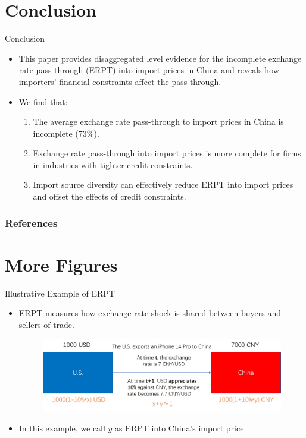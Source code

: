 \documentclass[10pt]{beamer}
\begin{document}
\section{Conclusion}

\begin{frame}{Conclusion}
	\begin{itemize}
		\item This paper provides disaggregated level evidence for the incomplete exchange rate pass-through (ERPT) into import prices in China and reveals how importers’ financial constraints affect the pass-through.
		\item We find that:
		\begin{enumerate}
			\item The average exchange rate pass-through to import prices in China is incomplete (73\%).
			\item Exchange rate pass-through into import prices is more complete for firms in industries with tighter credit constraints.
			\item Import source diversity can effectively reduce ERPT into import prices and offset the effects of credit constraints.
		\end{enumerate}
	\end{itemize}
\end{frame}

\begin{frame}
    \frametitle{References}
    \footnotesize
    
\end{frame}

\appendix
\renewcommand{\thetable}{A.\arabic{table}}
\setcounter{table}{0}

\section*{More Figures}
\begin{frame}[label=example_ERPT]{Illustrative Example of ERPT}
    \begin{itemize}
        \item ERPT measures how exchange rate shock is shared between buyers and sellers of trade.
    \begin{figure}[htbp]
		\centering
		\includegraphics[width=0.9\columnwidth]{ERPT.jpg}
		\label{ERPT}
    \end{figure}
        \item In this example, we call $y$ as ERPT into China's import price.
    \end{itemize}
    \hyperlink{motivation1}{}
\end{frame}
\end{document}
